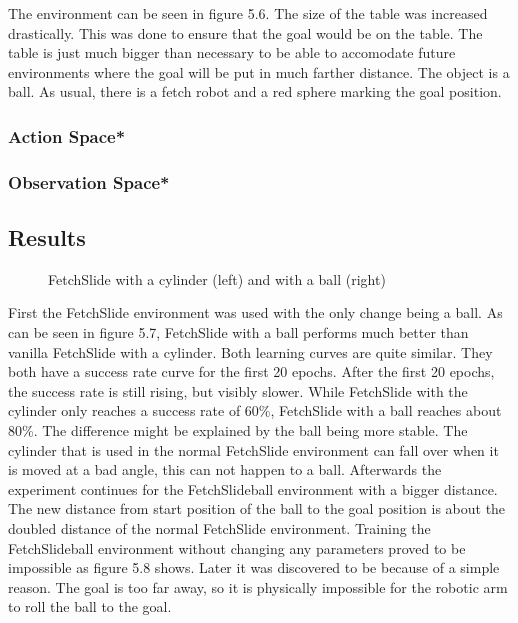 The environment can be seen in figure 5.6. The size of the table was increased drastically. This was done to ensure that the goal would be on the table. The table is just much bigger than necessary to be able to accomodate future environments where the goal will be put in much farther distance. The object is a ball. As usual, there is a fetch robot and a red sphere marking the goal position. 

\subsubsection{Action Space*}


\subsubsection{Observation Space*}




\subsection{Results}


\begin{figure} [h]
	
	\centering
	\caption{FetchSlide with a cylinder (left) and with a ball (right)}
	
\end{figure}


First the FetchSlide environment was used with the only change being a ball. As can be seen in figure 5.7, FetchSlide with a ball performs much better than vanilla FetchSlide with a cylinder. Both learning curves are quite similar. They both have a success rate curve for the first 20 epochs. After the first 20 epochs, the success rate is still rising, but visibly slower. While FetchSlide with the cylinder only reaches a success rate of 60\%, FetchSlide with a ball reaches about 80\%. The difference might be explained by the ball being more stable. The cylinder that is used in the normal FetchSlide environment can fall over when it is moved at a bad angle, this can not happen to a ball.
Afterwards the experiment continues for the FetchSlideball environment with a bigger distance. The new distance from start position of the ball to the goal position is about the doubled distance of the normal FetchSlide environment.
Training the FetchSlideball environment without changing any parameters proved to be impossible as figure 5.8 shows. Later it was discovered to be because of a simple reason. The goal is too far away, so it is physically impossible for the robotic arm to roll the ball to the goal.
 
